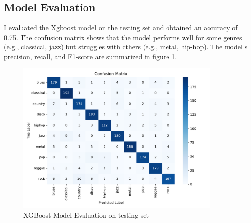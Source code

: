 \documentclass[11.5pt]{article}
\begin{document}
\subsection{Model Evaluation}
I evaluated the Xgboost model on the testing set and obtained an accuracy of 0.75. The confusion matrix shows that the model performs well for some genres (e.g., classical, jazz) but struggles with others (e.g., metal, hip-hop). The model's precision, recall, and F1-score are summarized in figure \ref{fig:xgboost_evaluation}.
\begin{figure}[H]
    \centering
    \includegraphics[width=0.9\textwidth]{graphics/confusion_matrix.pdf}
    \caption{XGBoost Model Evaluation on testing set}
    \label{fig:xgboost_evaluation}
\end{figure}
\end{document}
